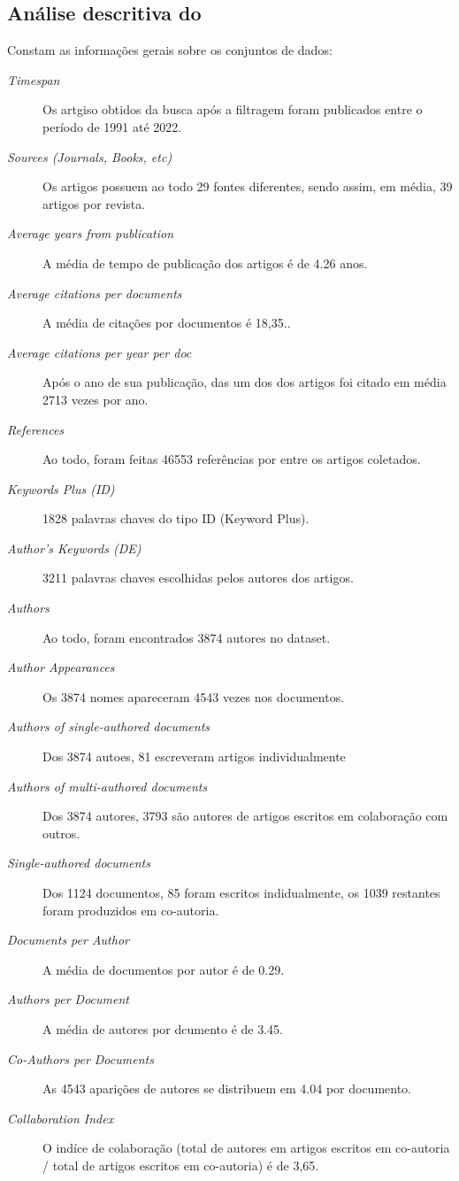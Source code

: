\subsection{Análise descritiva do \dataset\   }

Constam as informações gerais sobre os conjuntos de dados:
\begin{description}
    \item [\textit{Timespan}] Os artgiso obtidos da busca após a filtragem foram publicados entre o período de 1991 até 2022.
    \item [\textit{Sources (Journals, Books, etc)}] Os artigos possuem ao todo 29 fontes diferentes, sendo assim, em média, 39 artigos por revista.
    \item [\textit{Average years from publication}] A média de tempo de publicação dos artigos é de 4.26 anos.
    \item [\textit{Average citations per documents}] A média de citações por documentos é 18,35..
    \item [\textit{Average citations per year per doc}] Após o ano de sua publicação, das um dos dos artigos foi citado em média 2713 vezes por ano.
    \item [\textit{References}] Ao todo, foram feitas 46553  referências por entre os artigos coletados.
    \item [\textit{Keywords Plus (ID)}] 1828 palavras chaves do tipo ID (Keyword Plus).
    \item [\textit{Author's Keywords (DE)}]  3211 palavras chaves escolhidas pelos autores dos artigos.

    \item [\textit{Authors}]  Ao todo, foram encontrados 3874 autores no dataset.
    \item [\textit{Author Appearances}]  Os 3874 nomes apareceram 4543 vezes nos documentos.
    \item [\textit{Authors of single-authored documents}] Dos 3874 autoes, 81 escreveram artigos individualmente
    \item [\textit{Authors of multi-authored documents}] Dos 3874 autores, 3793 são autores de artigos escritos em colaboração com outros.
    \item [\textit{Single-authored documents}] Dos 1124 documentos, 85 foram escritos indidualmente, os 1039 restantes foram produzidos em co-autoria.
    \item [\textit{Documents per Author}] A média de documentos por autor é de 0.29.
    \item [\textit{Authors per Document}] A média de autores por dcumento é de 3.45.
    \item [\textit{Co-Authors per Documents}] As 4543 aparições de autores se distribuem em 4.04 por documento.
    \item [\textit{Collaboration Index}] O indíce de colaboração (total de autores em artigos escritos em co-autoria / total de artigos escritos em co-autoria) é de 3,65.
\end{description}

